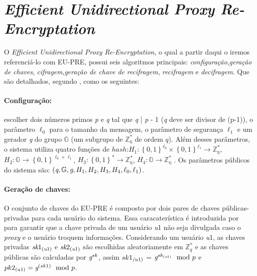 \section{\emph{Efficient Unidirectional Proxy Re-Encryptation}}
\label{recifragem:EU-PRE}
O \emph{Efficient Unidirectional Proxy Re-Encryptation}, o qual a partir daqui o iremos referenciá-lo com EU-PRE, possui seis algoritmos principais: \emph{configuração},\emph{geração de chaves}, \emph{cifragem},\emph{geração de chave de recifragem}, \emph{recifragem} e \emph{decifragem}. Que são detalhados, segundo \cite{mannes2016controle}, como os seguintes:

\paragraph{Configuração:} escolher dois números primos \emph{p} e \emph{q} tal que \emph{q} | \emph{p} - 1 (\emph{q} deve ser divisor de (p-1)), o parâmetro $\ell_0$ para o tamanho da mensagem, o parâmetro de segurança $\ell_1$ e um gerador \emph{g} do grupo $\mathbb{G}$ (um subgrupo de $\mathbb{Z^*_q}$ de ordem $q$). Além desses parâmetros, o sistema utiliza quatro funções de $hash$:$H_1 : {\left\{0,1\right\}}^{\ell_0} \times {\left\{0,1\right\}}^{\ell_1} \rightarrow \mathbb{Z^*_q}$, $H_2: \mathbb{G} \rightarrow {\left\{0,1\right\}}^{\ell_0 + \ell_1}$, $H_3 : {\left\{0,1\right\}}^{*} \rightarrow \mathbb{Z^*_q}$, $H_4 :  \mathbb{G} \rightarrow \mathbb{Z^*_q}$ . Os parâmetros públicos do sistema são: $\left(\emph{q},\mathbb{G},\emph{g},H_1,H_2,H_3,H_4,\ell_0,\ell_1\right)$.

\paragraph{Geração de chaves:} O conjunto de chaves do EU-PRE é composto por dois pares de chaves públicas-privadas para cada usuário do sistema. Essa caracaterística é introduzida por \cite{chow2010efficient} para garantir que a chave privada de um usuário \emph{u}1 não seja divulgada caso o \emph{proxy} e o usuário troquem informações. Considerando um usuário \emph{u}1, as chaves privadas $\emph{sk}1_{(\emph{u}1)}$ e $\emph{sk}2_{(\emph{u}1)}$ são escolhidas aleatoriamente em $\mathbb{Z}^*_q$ e as chaves públicas são calculadas por $\emph{g}^{sk}$, assim $sk1_{\emph({u}1)}$ = $\emph{g}^{sk_{(\emph{u}1)}}\mod{p}$ e $pk2_{(u1)} = \emph{g}^{(sk1)}\mod{p}$.   

